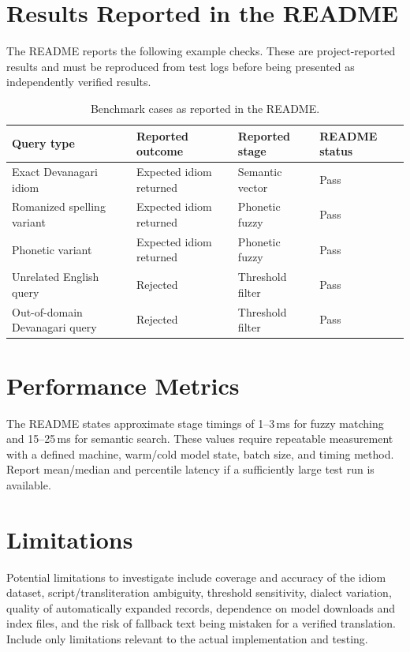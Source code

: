 \documentclass[12pt,a4paper]{report}
\begin{document}
\section{Results Reported in the README}
The README reports the following example checks. These are project-reported
results and must be reproduced from test logs before being presented as
independently verified results.

\begin{table}[ht]
    \centering
    \begin{tabularx}{\textwidth}{p{3.2cm}p{3.4cm}p{3.4cm}p{2.6cm}}
        \toprule
        \textbf{Query type} & \textbf{Reported outcome} & \textbf{Reported stage} & \textbf{README status}\\
        \midrule
        Exact Devanagari idiom & Expected idiom returned & Semantic vector & Pass\\
        Romanized spelling variant & Expected idiom returned & Phonetic fuzzy & Pass\\
        Phonetic variant & Expected idiom returned & Phonetic fuzzy & Pass\\
        Unrelated English query & Rejected & Threshold filter & Pass\\
        Out-of-domain Devanagari query & Rejected & Threshold filter & Pass\\
        \bottomrule
    \end{tabularx}
    \caption{Benchmark cases as reported in the README.}
    \label{tab:results}
\end{table}

\section{Performance Metrics}
The README states approximate stage timings of 1--3\,ms for fuzzy matching and
15--25\,ms for semantic search. These values require repeatable measurement with a
defined machine, warm/cold model state, batch size, and timing method. Report
mean/median and percentile latency if a sufficiently large test run is available.

\section{Limitations}
Potential limitations to investigate include coverage and accuracy of the idiom
dataset, script/transliteration ambiguity, threshold sensitivity, dialect
variation, quality of automatically expanded records, dependence on model
downloads and index files, and the risk of fallback text being mistaken for a
verified translation. Include only limitations relevant to the actual
implementation and testing.
\end{document}
